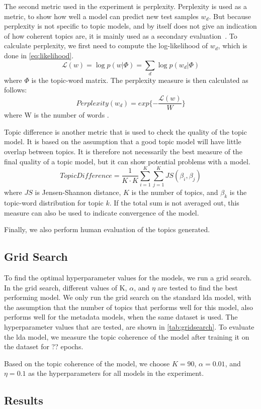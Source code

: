 The second metric used in the experiment is perplexity.
Perplexity is used as a metric, to show how well a model can predict new test samples $w_d$.
But because perplexity is not specific to topic models, and by itself does not give an indication of how coherent topics are, it is mainly used as a secondary evaluation~\cite{tea_leaves}.
To calculate perplexity, we first need to compute the log-likelihood of $w_d$, which is done in \autoref{eq:likelihood}.
\begin{equation}\label{eq:likelihood}
	\mathcal{L}(w) = \log p(w|\Phi) = \sum_{d} \log p(w_d|\Phi)
\end{equation}
\noindent where $\Phi$ is the topic-word matrix.
The perplexity measure is then calculated as follows:
\begin{equation}
	Perplexity(w_d) = exp \{-\frac{\mathcal{L}(w)}{W}\}
\end{equation}
\noindent where W is the number of words \cite{de2008evaluating}.

Topic difference is another metric that is used to check the quality of the topic model.
It is based on the assumption that a good topic model will have little overlap between topics.
It is therefore not necessarily the best measure of the final quality of a topic model, but it can show potential problems with a model.
\begin{equation}
	TopicDifference = \frac{1}{K \cdot K} \sum_{i=1}^{K} \sum_{j=1}^{K} JS(\beta_{i},\beta_{j})
\end{equation}
\noindent where $JS$ is Jensen-Shannon distance, $K$ is the number of topics, and $\beta_{k}$ is the topic-word distribution for topic $k$.
If the total sum is not averaged out, this measure can also be used to indicate convergence of the model.

Finally, we also perform human evaluation of the topics generated.

\subsection{Grid Search}\label{sec:experiment_gridsearch}
To find the optimal hyperparameter values for the models, we run a grid search.
In the grid search, different values of K, $\alpha$, and $\eta$ are tested to find the best performing model.
We only run the grid search on the standard \gls{lda} model, with the assumption that the number of topics that performs well for this model, also performs well for the metadata models, when the same dataset is used.
The hyperparameter values that are tested, are shown in \autoref{tab:gridsearch}.
To evaluate the \gls{lda} model, we measure the topic coherence of the model after training it on the dataset for ?? epochs.

Based on the topic coherence of the model, we choose $K = 90$, $\alpha = 0.01$, and $\eta = 0.1$ as the hyperparameters for all models in the experiment.



\subsection{Results}\label{sec:results}


